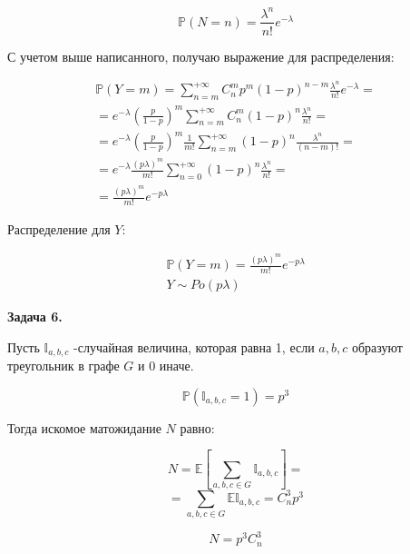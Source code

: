 \documentclass[12pt]{article}
\begin{document}
\begin{equation*}
\mathbb{P}(N = n) = \frac{\lambda^n}{n!}e^{-\lambda}
\end{equation*}

С учетом выше написанного, получаю выражение для распределения:

\begin{equation*}
\begin{gathered}
\mathbb{P}(Y = m) = \sum\limits_{n=m}^{+\infty}C_n^m p^m(1-p)^{n-m}\frac{\lambda^n}{n!}e^{-\lambda} =\\=e^{-\lambda}\left(\frac{p}{1-p}\right)^m\sum\limits_{n=m}^{+\infty} C_n^m (1-p)^n\frac{\lambda^n}{n!} = \\
= e^{-\lambda}\left(\frac{p}{1-p}\right)^m\frac{1}{m!}\sum\limits_{n=m}^{+\infty} (1-p)^n\frac{\lambda^n}{(n-m)!} = \\
= e^{-\lambda}\frac{(p\lambda)^m}{m!}\sum\limits_{n=0}^{+\infty} (1-p)^n\frac{\lambda^n}{n!} = \\
= \frac{(p\lambda)^m}{m!}e^{-p\lambda}
\end{gathered}
\end{equation*}

Распределение для $Y$:

\begin{equation*}
\boxed{
\begin{gathered}
\mathbb{P}(Y = m) = \frac{(p\lambda)^m}{m!}e^{-p\lambda}\\
Y \sim Po(p\lambda)
\end{gathered}}
\end{equation*}

\begin{center}
\textbf{Задача 6.}
\end{center}

Пусть $\mathbb{I}_{a, b,c}$ -случайная величина, которая равна 1, если $a, b, c$ образуют треугольник в графе $G$ и 0 иначе.

$$\mathbb{P}(\mathbb{I}_{a, b,c} = 1) = p^3$$

Тогда искомое матожидание $N$ равно:

$$N = \mathbb{E}\left[\sum\limits_{a, b, c \in G}\mathbb{I}_{a, b,c}\right] =$$
$$= \sum\limits_{a, b, c \in G}\mathbb{E}\mathbb{I}_{a, b,c} = C_n^3 p^3$$

$$\boxed{N = p^3C_n^3}$$
\end{document}
